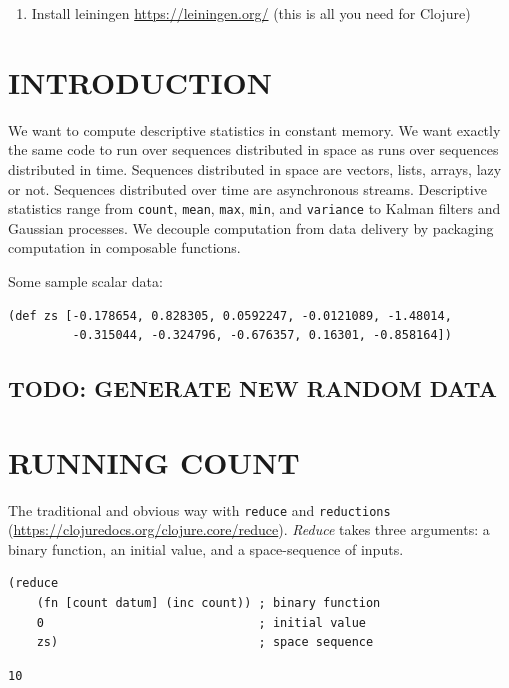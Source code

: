 \documentclass[10pt,oneside,x11names]{article}
\begin{document}
\begin{enumerate}
\item Install leiningen \url{https://leiningen.org/} (this is all you need for Clojure)
\end{enumerate}

\section{INTRODUCTION}
\label{introduction}
We want to compute descriptive statistics in constant memory. We want
exactly the same code to run over sequences distributed in space as runs
over sequences distributed in time. Sequences distributed in space are
vectors, lists, arrays, lazy or not. Sequences distributed over time are
asynchronous streams. Descriptive statistics range from \texttt{count}, \texttt{mean},
\texttt{max}, \texttt{min}, and \texttt{variance} to Kalman filters and Gaussian processes.
We decouple computation from data delivery by packaging computation in
composable functions.

Some sample scalar data:

\begin{verbatim}
(def zs [-0.178654, 0.828305, 0.0592247, -0.0121089, -1.48014,
         -0.315044, -0.324796, -0.676357, 0.16301, -0.858164])
\end{verbatim}

\subsection{TODO: GENERATE NEW RANDOM DATA}
\label{sec:org2cfc3af}

\section{RUNNING COUNT}
\label{running-count}
The traditional and obvious way with \texttt{reduce} and \texttt{reductions}
(\url{https://clojuredocs.org/clojure.core/reduce}). \emph{Reduce} takes three
arguments: a binary function, an initial value, and a space-sequence of
inputs.

\begin{verbatim}
(reduce
    (fn [count datum] (inc count)) ; binary function
    0                              ; initial value
    zs)                            ; space sequence
\end{verbatim}

\begin{verbatim}
10
\end{verbatim}
\end{document}
